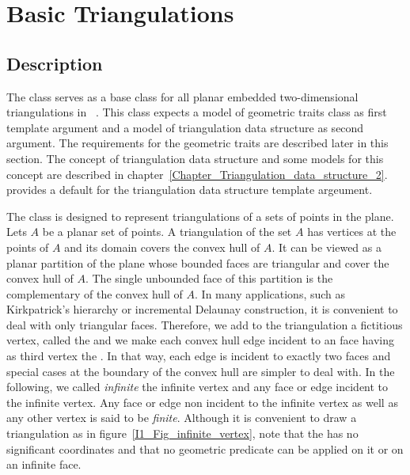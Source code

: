 \section{Basic Triangulations}
\label{Section_2D_Triangulations_Basic}

\subsection{Description}
\label{Subsection_2D_Triangulations_Basic_Description}

The class 
serves as a base class for all
planar embedded two-dimensional triangulations
in \cgal\ .
This class expects a model of  {geometric traits} class
as first template argument and a model of {triangulation data structure}
as second argument. The requirements  for the geometric traits
are described later in this section. 
The concept of 
{triangulation data structure} and some models for this concept are
described in chapter~\ref{Chapter_Triangulation_data_structure_2}.
\cgal provides a default for the triangulation data structure
template argeument.
 
The class 
is designed to represent triangulations
 of a sets of points in the plane.
Lets ${  A}$ be a planar set of points.  
A triangulation of the set ${  A}$ has vertices at the points of ${  A}$
and its domain covers the convex hull of ${  A}$.
It can be viewed as a planar partition of the plane
whose bounded faces are triangular and cover
the convex hull of ${  A}$. The single unbounded face of this partition
is the complementary of the convex hull of ${  A}$. 
In many applications, such as Kirkpatrick's hierarchy
or incremental Delaunay construction, it is convenient to
deal with only triangular faces. Therefore, we add to the
triangulation
a fictitious vertex, called the 
and we make each  convex hull edge incident 
to an  
face having as third vertex  the .
 In that way, each edge is incident to exactly two faces
and special cases at the
boundary of the convex hull are simpler to deal with.
In the following, we called {\it infinite}  the infinite vertex
and any face or edge 
incident  to the infinite vertex. Any face or edge non incident
to the infinite vertex as well as any other vertex
  is said 
to be {\it finite}.
Although it is convenient to draw a triangulation as in
figure~\ref{I1_Fig_infinite_vertex}, note that
the  has no significant
coordinates and that no geometric predicate can be applied on it
or on an infinite face.


